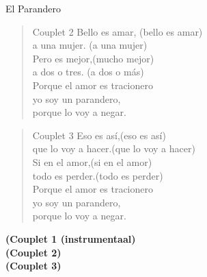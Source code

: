 \begin{song}{El Parandero}
\begin{verse}{Couplet 2}
Bello es amar, \hspace{6em}(bello es amar)\\
a una mujer.\hspace{6.9em} (a una mujer)\\
Pero \chord{}es mejor,\hspace{6.3em}(mucho mejor)\\
a dos o tres. \hspace{6.9em}(a dos o más)\\
Porque el amor es tracionero\\
yo soy un parandero,\\
porque lo voy a negar.  \hspace{1em} 
\end{verse}
\clearpage
\begin{verse}{Couplet 3}
Eso es así,\hspace{7.7em}(eso es así)\\
que lo voy a hacer.\hspace{4.3em}(que lo voy a hacer)\\
Si en \chord{}el amor,\hspace{6.6em}(si en el amor)\\
todo es perder.\hspace{6em}(todo es perder)\\
Porque el amor es tracionero\\
yo soy un parandero,\\
porque lo voy a negar.  \hspace{1em} 
\end{verse}

\textbf{(Couplet 1 (instrumentaal)}\\

\textbf{(Couplet 2)}\\

\textbf{(Couplet 3)}
\end{song}

